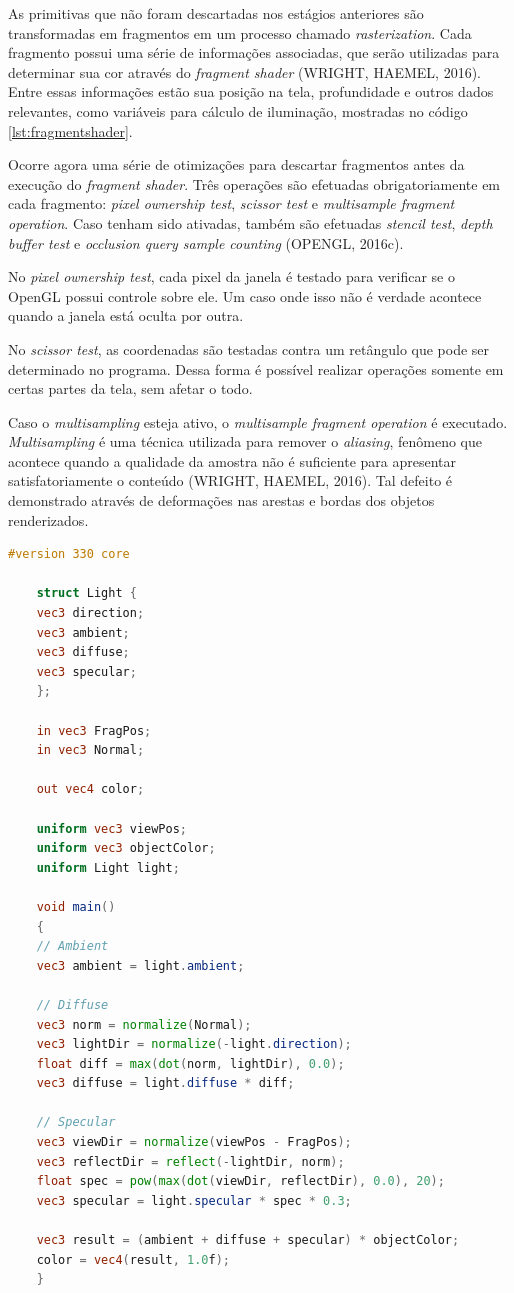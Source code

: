 As primitivas que não foram descartadas nos estágios anteriores são transformadas em fragmentos em um processo chamado \textit{rasterization}. Cada fragmento possui uma série de informações associadas, que serão utilizadas para determinar sua cor através do \textit{fragment shader} (WRIGHT, HAEMEL, 2016). Entre essas informações estão sua posição na tela, profundidade e outros dados relevantes, como variáveis para cálculo de iluminação, mostradas no código \ref{lst:fragmentshader}.

Ocorre agora uma série de otimizações para descartar fragmentos antes da execução do \textit{fragment shader}. Três operações são efetuadas obrigatoriamente em cada fragmento: \textit{pixel ownership test}, \textit{scissor test} e \textit{multisample fragment operation}. Caso tenham sido ativadas, também são efetuadas \textit{stencil test}, \textit{depth buffer test} e \textit{occlusion query sample counting} (OPENGL, 2016c).

No \textit{pixel ownership test}, cada pixel da janela é testado para verificar se o OpenGL possui controle sobre ele. Um caso onde isso não é verdade acontece quando a janela está oculta por outra.

No \textit{scissor test}, as coordenadas são testadas contra um retângulo que pode ser determinado no programa. Dessa forma é possível realizar operações somente em certas partes da tela, sem afetar o todo.

Caso o \textit{multisampling} esteja ativo, o \textit{multisample fragment operation} é executado. \textit{Multisampling} é uma técnica utilizada para remover o \textit{aliasing}, fenômeno que acontece quando a qualidade da amostra não é suficiente para apresentar satisfatoriamente o conteúdo (WRIGHT, HAEMEL, 2016). Tal defeito é demonstrado através de deformações nas arestas e bordas dos objetos renderizados.

\begin{lstlisting}[language=glsl,
label={lst:fragmentshader},
caption="Exemplo de \textit{fragment shader}"]
	#version 330 core
	
	struct Light {
	vec3 direction;
	vec3 ambient;
	vec3 diffuse;
	vec3 specular;
	};
	
	in vec3 FragPos;  
	in vec3 Normal;  
	
	out vec4 color;
	
	uniform vec3 viewPos;
	uniform vec3 objectColor;
	uniform Light light;
	
	void main()
	{
	// Ambient
	vec3 ambient = light.ambient;
	
	// Diffuse 
	vec3 norm = normalize(Normal);
	vec3 lightDir = normalize(-light.direction); 
	float diff = max(dot(norm, lightDir), 0.0);
	vec3 diffuse = light.diffuse * diff;
	
	// Specular
	vec3 viewDir = normalize(viewPos - FragPos);
	vec3 reflectDir = reflect(-lightDir, norm);  
	float spec = pow(max(dot(viewDir, reflectDir), 0.0), 20);
	vec3 specular = light.specular * spec * 0.3;  
	
	vec3 result = (ambient + diffuse + specular) * objectColor;
	color = vec4(result, 1.0f);
	} 
\end{lstlisting}

